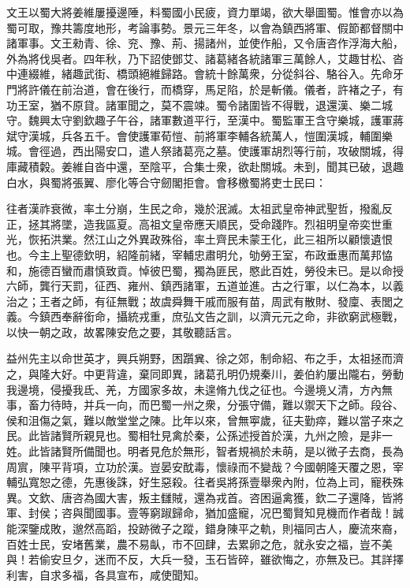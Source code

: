 \begin{pinyinscope}
 
 
 
 文王以蜀大將姜維屢擾邊陲，料蜀國小民疲，資力單竭，欲大舉圖蜀。惟會亦以為蜀可取，豫共籌度地形，考論事勢。景元三年冬，以會為鎮西將軍、假節都督關中諸軍事。文王勑青、徐、兖、豫、荊、揚諸州，並使作船，又令唐咨作浮海大船，外為將伐吳者。四年秋，乃下詔使鄧艾、諸葛緒各統諸軍三萬餘人，艾趣甘松、沓中連綴維，緒趣武街、橋頭絕維歸路。會統十餘萬衆，分從斜谷、駱谷入。先命牙門將許儀在前治道，會在後行，而橋穿，馬足陷，於是斬儀。儀者，許褚之子，有功王室，猶不原貸。諸軍聞之，莫不震竦。蜀令諸圍皆不得戰，退還漢、樂二城守。魏興太守劉欽趣子午谷，諸軍數道平行，至漢中。蜀監軍王含守樂城，護軍蔣斌守漢城，兵各五千。會使護軍荀愷、前將軍李輔各統萬人，愷圍漢城，輔圍樂城。會徑過，西出陽安口，遣人祭諸葛亮之墓。使護軍胡烈等行前，攻破關城，得庫藏積糓。姜維自沓中還，至陰平，合集士衆，欲赴關城。未到，聞其已破，退趣白水，與蜀將張翼、廖化等合守劒閣拒會。會移檄蜀將吏士民曰：
 
 
 
 
 往者漢祚衰微，率土分崩，生民之命，幾於泯滅。太祖武皇帝神武聖哲，撥亂反正，拯其將墜，造我區夏。高祖文皇帝應天順民，受命踐阼。烈祖明皇帝奕世重光，恢拓洪業。然江山之外異政殊俗，率土齊民未蒙王化，此三祖所以顧懷遺恨也。今主上聖德欽明，紹隆前緒，宰輔忠肅明允，劬勞王室，布政垂惠而萬邦恊和，施德百蠻而肅慎致貢。悼彼巴蜀，獨為匪民，愍此百姓，勞役未已。是以命授六師，龔行天罰，征西、雍州、鎮西諸軍，五道並進。古之行軍，以仁為本，以義治之；王者之師，有征無戰；故虞舜舞干戚而服有苗，周武有散財、發廩、表閭之義。今鎮西奉辭銜命，攝統戎重，庶弘文告之訓，以濟元元之命，非欲窮武極戰，以快一朝之政，故畧陳安危之要，其敬聽話言。
 
 
 
 
 益州先主以命世英才，興兵朔野，困躓兾、徐之郊，制命紹、布之手，太祖拯而濟之，與隆大好。中更背違，棄同即異，諸葛孔明仍規秦川，姜伯約屢出隴右，勞動我邊境，侵擾我氐、羌，方國家多故，未遑脩九伐之征也。今邊境乂清，方內無事，畜力待時，并兵一向，而巴蜀一州之衆，分張守備，難以禦天下之師。段谷、侯和沮傷之氣，難以敵堂堂之陳。比年以來，曾無寕歲，征夫勤瘁，難以當子來之民。此皆諸賢所親見也。蜀相牡見禽於秦，公孫述授首於漢，九州之險，是非一姓。此皆諸賢所備聞也。明者見危於無形，智者規禍於未萌，是以微子去商，長為周賔，陳平背項，立功於漢。豈晏安酖毒，懷祿而不變哉？今國朝隆天覆之恩，宰輔弘寬恕之德，先惠後誅，好生惡殺。往者吳將孫壹舉衆內附，位為上司，寵秩殊異。文欽、唐咨為國大害，叛主讎賊，還為戎首。咨困逼禽獲，欽二子還降，皆將軍、封侯；咨與聞國事。壹等窮踧歸命，猶加盛寵，况巴蜀賢知見機而作者哉！誠能深鑒成敗，邈然高蹈，投跡微子之蹤，錯身陳平之軌，則福同古人，慶流來裔，百姓士民，安堵舊業，農不易畒，巿不回肆，去累卵之危，就永安之福，豈不美與！若偷安旦夕，迷而不反，大兵一發，玉石皆碎，雖欲悔之，亦無及已。其詳擇利害，自求多福，各具宣布，咸使聞知。
 

\end{pinyinscope}
